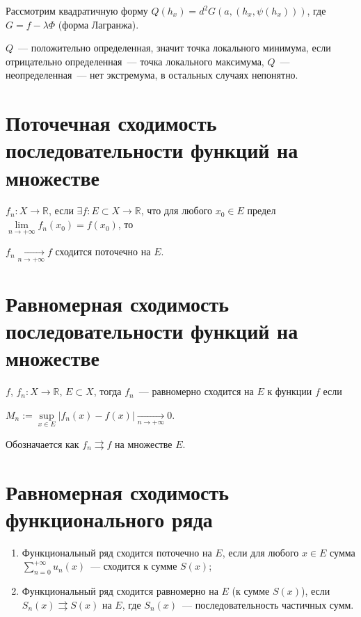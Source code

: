 \documentclass{article}
\begin{document}
        Рассмотрим квадратичную форму $Q(h_x) = d^2 G(a, \left( h_x, \psi (h_x ) \right) )$, где $G = f - \lambda \Phi$ (форма Лагранжа).
        
        $Q$~--- положительно определенная, значит точка локального минимума, если отрицательно определенная~--- точка локального максимума, $Q$~--- неопределенная~--- нет экстремума, в остальных случаях непонятно.
        
    \newpage
    
    \section{Поточечная сходимость последовательности функций на множестве }
    
        $f_n : X \rightarrow \mathbb{R}$, если $\exists f : E \subset X \rightarrow \mathbb{R}$, что для любого $x_0 \in E$ предел $\lim\limits_{n \rightarrow +\infty} f_n(x_0) = f(x_0)$, то
        
        $f_n \xrightarrow[n \rightarrow +\infty]{} f$ сходится поточечно на $E$.
        
    \newpage
    
    \section{Равномерная сходимость последовательности функций на множестве }
    
        $f$, $f_n : X \rightarrow \mathbb{R}$, $E \subset X$, тогда $f_n$~--- равномерно сходится на $E$ к функции $f$ если
        
        $M_n := \sup\limits_{x \in E} \left| f_n(x) - f(x) \right| \xrightarrow[n \rightarrow +\infty]{} 0$.
        
        Обозначается как $f_n \rightrightarrows f$ на множестве $E$.
        
    \newpage
    
    \section{Равномерная сходимость функционального ряда}
    
        \begin{enumerate}
        
            \item Функциональный ряд сходится поточечно на $E$, если для любого $x \in E$ сумма $\sum\limits^{+\infty}_{n = 0} u_n(x)$~--- сходится к сумме $S(x)$;
            
            \item Функциональный ряд сходится равномерно на $E$ (к сумме $S(x)$), если $S_n(x) \rightrightarrows S(x)$ на $E$, где $S_n(x)$~--- последовательность частичных сумм.
            
        \end{enumerate}
        
\end{document}
